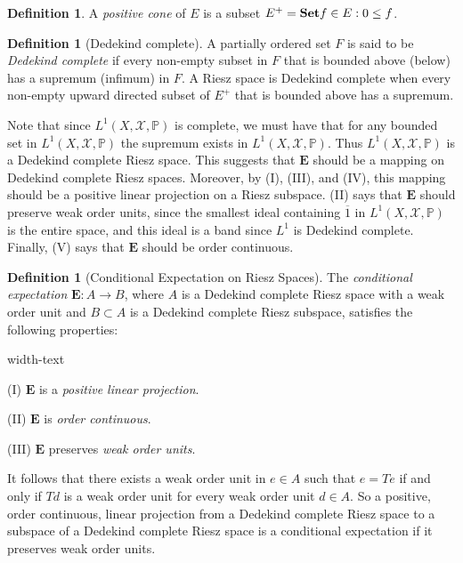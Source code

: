 \documentclass[letterpaper,10pt,oneside,onecolumn,reqno]{amsart}
\renewcommand{\P}{\mathbb P}
\newcommand{\X}{\mathcal X}
\theoremstyle{definition}
\newtheorem{defn}[thm]{Definition}
\newcommand{\catname}[1]{{\normalfont\textbf{#1}}}
\newcommand{\Set}{\catname{Set}}
\renewcommand{\bar}[1]{\overline{#1}}
\begin{document}
\begin{defn}
A \emph{positive cone} of $E$ is a subset $E^+ = \Set{f \in E : 0 \leq f}$.
\end{defn}


\begin{defn}[Dedekind complete]
A partially ordered set $F$ is said to be \emph{Dedekind complete} if every non-empty subset in $F$ that is bounded above (below) has a supremum (infimum) in $F$. A Riesz space is Dedekind complete when every non-empty upward directed subset of $E^+$ that is bounded above has a supremum.
\end{defn}


Note that since $L^1(X,\X,\P)$ is complete, we must have that for any bounded set in $L^1(X,\X,\P)$ the supremum exists in $L^1(X,\X,\P)$. Thus $L^1(X,\X,\P)$ is a Dedekind complete Riesz space. This suggests that $\mathbf{E}$ should be a mapping on Dedekind complete Riesz spaces. Moreover, by (I), (III), and (IV), this mapping should be a positive linear projection on a Riesz subspace. (II) says that $\mathbf{E}$ should preserve weak order units, since the smallest ideal containing $\bar{1}$ in $L^1(X,\X,\P)$ is the entire space, and this ideal is a band since $L^1$ is Dedekind complete. Finally, (V) says that $\mathbf{E}$ should be order continuous. 

\begin{defn}[Conditional Expectation on Riesz Spaces]
The \emph{conditional expectation} $\mathbf{E}: A \to B$, where $A$ is a Dedekind complete Riesz space with a weak order unit and $B \subset A$ is a Dedekind complete Riesz subspace, satisfies the following properties:

\begin{deflist}{width-text}
\item[(I)] $\mathbf{E}$ is a \emph{positive linear projection}.
\item[(II)] $\mathbf{E}$ is \emph{order continuous}.
\item[(III)] $\mathbf{E}$ preserves \emph{weak order units}.
\end{deflist}

It follows that there exists a weak order unit in $e \in A$ such that $e = Te$ if and only if $Td$ is a weak order unit for every weak order unit $d \in A$. So a positive, order continuous, linear projection from a Dedekind complete Riesz space to a subspace of a Dedekind complete Riesz space is a conditional expectation if it preserves weak order units.
\end{defn}
\end{document}
